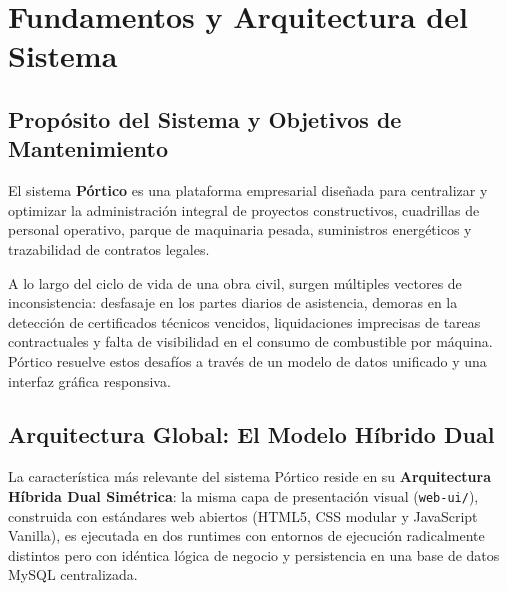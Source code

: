 \documentclass[11pt,a4paper,openany]{report}
\begin{document}
\chapter{Fundamentos y Arquitectura del Sistema}

\section{Propósito del Sistema y Objetivos de Mantenimiento}

El sistema \textbf{Pórtico} es una plataforma empresarial diseñada para centralizar y optimizar la administración integral de proyectos constructivos, cuadrillas de personal operativo, parque de maquinaria pesada, suministros energéticos y trazabilidad de contratos legales.

A lo largo del ciclo de vida de una obra civil, surgen múltiples vectores de inconsistencia: desfasaje en los partes diarios de asistencia, demoras en la detección de certificados técnicos vencidos, liquidaciones imprecisas de tareas contractuales y falta de visibilidad en el consumo de combustible por máquina. Pórtico resuelve estos desafíos a través de un modelo de datos unificado y una interfaz gráfica responsiva.

\electricsep

\section{Arquitectura Global: El Modelo Híbrido Dual}

La característica más relevante del sistema Pórtico reside en su \textbf{Arquitectura Híbrida Dual Simétrica}: la misma capa de presentación visual (\texttt{web-ui/}), construida con estándares web abiertos (HTML5, CSS modular y JavaScript Vanilla), es ejecutada en dos runtimes con entornos de ejecución radicalmente distintos pero con idéntica lógica de negocio y persistencia en una base de datos MySQL centralizada.
\end{document}
